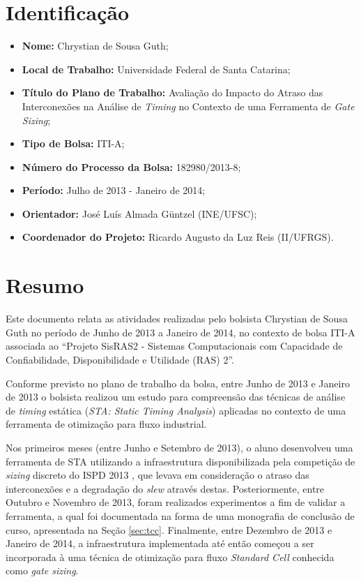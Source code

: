 \documentclass[
	12pt,				%
	openright,			%
	twoside,			%
	a4paper,			%
	english,			%
	french,				%
	spanish,			%
	brazil,				%
	]{abntex2}
\begin{document}
\section{Identificação}

\begin{itemize}
	\item \textbf{Nome:} Chrystian de Sousa Guth;
	\item \textbf{Local de Trabalho:} Universidade Federal de Santa Catarina;
	\item \textbf{Título do Plano de Trabalho:} Avaliação do Impacto do Atraso das Interconexões na Análise de \textit{Timing} no Contexto de uma Ferramenta de \textit{Gate Sizing};
	\item \textbf{Tipo de Bolsa:} ITI-A;
	\item \textbf{Número do Processo da Bolsa:} 182980/2013-8;
	\item \textbf{Período:} Julho de 2013 - Janeiro de 2014;
	\item \textbf{Orientador:} José Luís Almada Güntzel (INE/UFSC);
	\item \textbf{Coordenador do Projeto:} Ricardo Augusto da Luz Reis (II/UFRGS).
\end{itemize}

\section{Resumo}
Este documento relata as atividades realizadas pelo bolsista Chrystian de Sousa Guth no período de Junho de 2013 a Janeiro de 2014, no contexto de bolsa ITI-A associada ao ``Projeto SisRAS2 - Sistemas Computacionais com Capacidade de Confiabilidade, Disponibilidade e Utilidade (RAS) 2''.

Conforme previsto no plano de trabalho da bolsa, entre Junho de 2013 e Janeiro de 2013 o bolsista realizou um estudo para compreensão das técnicas de análise de \textit{timing} estática (\textit{STA: Static Timing Analysis}) aplicadas no contexto de uma ferramenta de otimização para fluxo industrial.

Nos primeiros meses (entre Junho e Setembro de 2013), o aluno desenvolveu uma ferramenta de STA utilizando a infraestrutura disponibilizada pela competição de \textit{sizing} discreto do ISPD 2013 \cite{Contest2013}, que levava em consideração o atraso das interconexões e a degradação do \textit{slew} através destas. Posteriormente, entre Outubro e Novembro de 2013, foram realizados experimentos a fim de validar a ferramenta, a qual foi documentada na forma de uma monografia de conclusão de curso, apresentada na Seção \ref{sec:tcc}. Finalmente, entre Dezembro de 2013 e Janeiro de 2014, a infraestrutura implementada até então começou a ser incorporada à uma técnica de otimização para fluxo \textit{Standard Cell} conhecida como \textit{gate sizing}.
\end{document}
